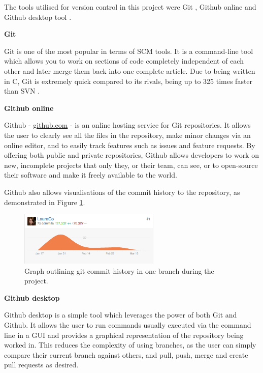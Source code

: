 The tools utilised for version control in this project were Git \cite{2014gits}, Github online \cite{github} and Github desktop tool \cite{github_desktop}.

\noindent \textbf{Git}

Git \cite{2014gits} is one of the most popular in terms of \acrfull{SCM} tools. It is a command-line tool which allows you to work on sections of code completely independent of each other and later merge them back into one complete article. Due to being written in C, Git is extremely quick compared to its rivals, being up to 325 times faster than \acrfull{SVN} \cite{About_Git}.

\noindent \textbf{Github online}

Github \cite{github} - \url{github.com} - is an online hosting service for Git repositories. It allows the user to clearly see all the files in the repository, make minor changes via an online editor, and to easily track features such as issues and feature requests. By offering both public and private repositories, Github allows developers to work on new, incomplete projects that only they, or their team, can see, or to open-source their software and make it freely available to the world.

Github also allows visualisations of the commit history to the repository, as demonstrated in Figure \ref{fig:git-graph}.

\begin{figure}[H]
  \centering
  \includegraphics[width=0.6\textwidth]{Chapter2/tools/git_graph.png}
  \caption{Graph outlining git commit history in one branch during the project.}
  \label{fig:git-graph}
\end{figure}

\noindent \textbf{Github desktop}

Github desktop \cite{github_desktop} is a simple tool which leverages the power of both Git and Github. It allows the user to run commands usually executed via the command line in a \acrshort{GUI} and provides a graphical representation of the repository being worked in. This reduces the complexity of using branches, as the user can simply compare their current branch against others, and pull, push, merge and create pull requests as desired.

